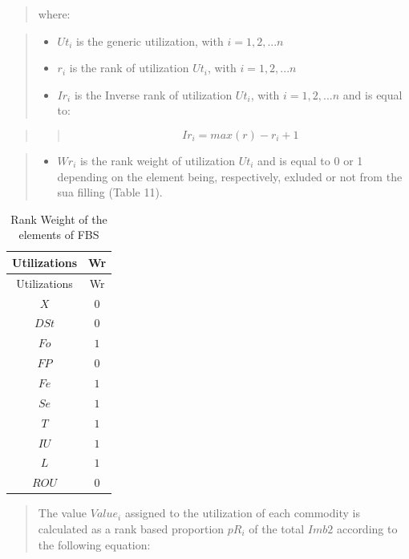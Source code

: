 \documentclass[]{article}
\providecommand{\tightlist}{%
  \setlength{\itemsep}{0pt}\setlength{\parskip}{0pt}}
\begin{document}
\begin{quote}
where:
\end{quote}

\begin{quote}
\begin{itemize}
\tightlist
\item
  \(Ut_{i}\) is the generic utilization, with \(i=1,2,...n\)
\item
  \(r_{i}\) is the rank of utilization \(Ut_{i}\), with \(i=1,2,...n\)
\item
  \(Ir_{i}\) is the Inverse rank of utilization \(Ut_{i}\), with
  \(i=1,2,...n\) and is equal to:
\end{itemize}
\end{quote}

\begin{quote}
\begin{quote}
\begin{equation}
\label{eq:inverseRankequation}
Ir_{i} = max(r)-r_{i}+1
\end{equation}
\end{quote}
\end{quote}

\begin{quote}
\begin{itemize}
\tightlist
\item
  \(Wr_{i}\) is the rank weight of utilization \(Ut_{i}\) and is equal
  to 0 or 1 depending on the element being, respectively, exluded or not
  from the sua filling (Table 11).
\end{itemize}
\end{quote}

\begin{longtable}[]{@{}cc@{}}
\caption{Rank Weight of the elements of FBS}\tabularnewline
\toprule
Utilizations & Wr\tabularnewline
\midrule
\endfirsthead
\toprule
Utilizations & Wr\tabularnewline
\midrule
\endhead
\(X\) & \(0\)\tabularnewline
\(DSt\) & \(0\)\tabularnewline
\(Fo\) & \(1\)\tabularnewline
\(FP\) & \(0\)\tabularnewline
\(Fe\) & \(1\)\tabularnewline
\(Se\) & \(1\)\tabularnewline
\(T\) & \(1\)\tabularnewline
\(IU\) & \(1\)\tabularnewline
\(L\) & \(1\)\tabularnewline
\(ROU\) & \(0\)\tabularnewline
\bottomrule
\end{longtable}

\begin{quote}
The value \(Value_{i}\) assigned to the utilization of each commodity is
calculated as a rank based proportion \(pR_{i}\) of the total \(Imb2\)
according to the following equation:
\end{quote}
\end{document}

